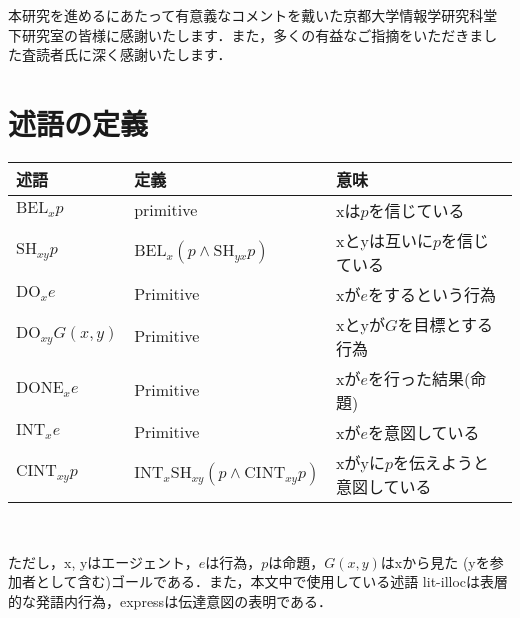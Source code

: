 \acknowledgment

本研究を進めるにあたって有意義なコメントを戴いた京都大学情報学研究科堂
下研究室の皆様に感謝いたします．また，多くの有益なご指摘をいただきまし
た査読者氏に深く感謝いたします．


\appendix

\section{述語の定義}
\label{appendixA}

\begin{table}[htbp]
\begin{center}
\begin{tabular}{|l|l|l|}
\hline
述語 & 定義 & 意味\\
\hline
\hline
$\mbox{BEL}_x p$ & primitive & xは$p$を信じている\\
\hline
$\mbox{SH}_{xy} p$ & $\mbox{BEL}_x (p \land \mbox{SH}_{yx} p)$ &
xとyは互いに$p$を信じている\\
\hline
$\mbox{DO}_x e$ & Primitive & xが$e$をするという行為\\
\hline
$\mbox{DO}_{xy} G(x, y)$ & Primitive & xとyが$G$を目標とする行為\\
\hline
$\mbox{DONE}_x e$ & Primitive & xが$e$を行った結果(命題)\\
\hline
$\mbox{INT}_x e$ & Primitive & xが$e$を意図している\\
\hline
$\mbox{CINT}_{xy} p$ & $\mbox{INT}_x \mbox{SH}_{xy} (p \land
\mbox{CINT}_{xy} p) $ &
xがyに$p$を伝えようと意図している\\
\hline
\end{tabular}\\
\end{center}

\medskip

ただし，x, yはエージェント，$e$は行為，$p$は命題，$G(x, y)$はxから見た
(yを参加者として含む)ゴールである．また，本文中で使用している述語
lit-illocは表層的な発語内行為，expressは伝達意図の表明である．

\end{table}



\vspace{3mm}



\begin{biography}


\end{biography}


